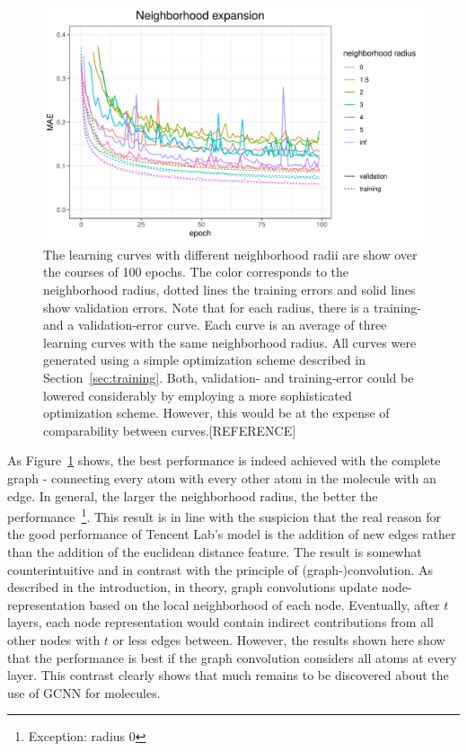 \begin{figure}[H]
	\includegraphics[width=\linewidth]{figures/tencent-mpnn-neighborhood-expansion}
	
	\caption{The learning curves with different neighborhood radii are show over the courses of 100 epochs. The color corresponds to the neighborhood radius, dotted lines the training errors and solid lines show validation errors. Note that for each radius, there is a training- and a validation-error curve. Each curve is an average of three learning curves with the same neighborhood radius. All curves were generated using a simple optimization scheme described in Section~\ref{sec:training}. Both, validation- and training-error could be lowered considerably by employing a more sophisticated optimization scheme. However, this would be at the expense of comparability between curves.[REFERENCE]}
	\label{fig:tencent-mpnn-neighborhood-expansion}
\end{figure}

As Figure~\ref{fig:tencent-mpnn-neighborhood-expansion} shows, the best performance is indeed achieved with the complete graph - connecting every atom with every other atom in the molecule with an edge. In general, the larger the neighborhood radius, the better the performance~\footnote{Exception: radius 0}. This result is in line with the suspicion that the real reason for the good performance of Tencent Lab's model is the addition of new edges rather than the addition of the euclidean distance feature.
The result is somewhat counterintuitive and in contrast with the principle of (graph-)convolution. As described in the introduction, in theory, graph convolutions update node-representation based on the local neighborhood of each node. Eventually, after $t$ layers, each node representation would contain indirect contributions from all other nodes with $t$ or less edges between. However, the results shown here show that the performance is best if the graph convolution considers all atoms at every layer. This contrast clearly shows that much remains to be discovered about the use of GCNN for molecules.

